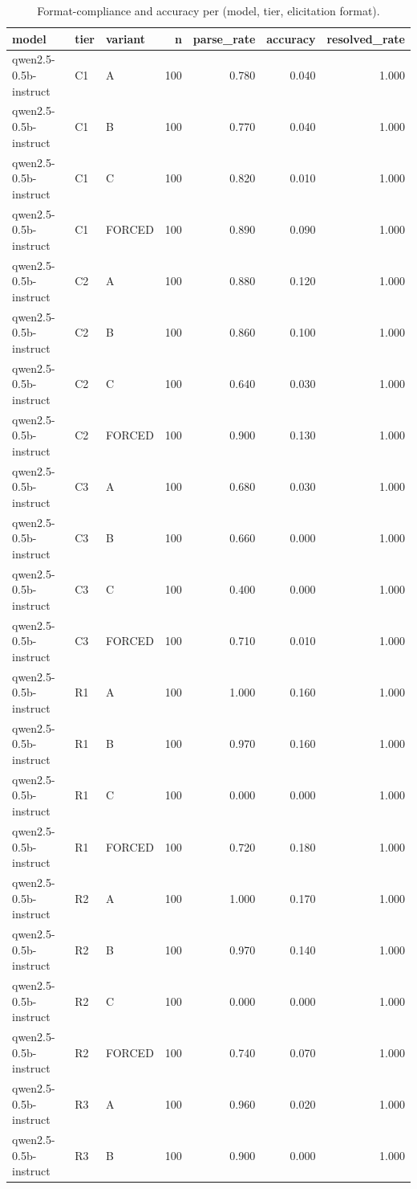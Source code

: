 \begin{table}
\caption{Format-compliance and accuracy per (model, tier, elicitation format).}
\label{tab:t3_parse_and_accuracy}
\begin{tabular}{lllrrrr}
\toprule
model & tier & variant & n & parse\_rate & accuracy & resolved\_rate \\
\midrule
qwen2.5-0.5b-instruct & C1 & A & 100 & 0.780 & 0.040 & 1.000 \\
qwen2.5-0.5b-instruct & C1 & B & 100 & 0.770 & 0.040 & 1.000 \\
qwen2.5-0.5b-instruct & C1 & C & 100 & 0.820 & 0.010 & 1.000 \\
qwen2.5-0.5b-instruct & C1 & FORCED & 100 & 0.890 & 0.090 & 1.000 \\
qwen2.5-0.5b-instruct & C2 & A & 100 & 0.880 & 0.120 & 1.000 \\
qwen2.5-0.5b-instruct & C2 & B & 100 & 0.860 & 0.100 & 1.000 \\
qwen2.5-0.5b-instruct & C2 & C & 100 & 0.640 & 0.030 & 1.000 \\
qwen2.5-0.5b-instruct & C2 & FORCED & 100 & 0.900 & 0.130 & 1.000 \\
qwen2.5-0.5b-instruct & C3 & A & 100 & 0.680 & 0.030 & 1.000 \\
qwen2.5-0.5b-instruct & C3 & B & 100 & 0.660 & 0.000 & 1.000 \\
qwen2.5-0.5b-instruct & C3 & C & 100 & 0.400 & 0.000 & 1.000 \\
qwen2.5-0.5b-instruct & C3 & FORCED & 100 & 0.710 & 0.010 & 1.000 \\
qwen2.5-0.5b-instruct & R1 & A & 100 & 1.000 & 0.160 & 1.000 \\
qwen2.5-0.5b-instruct & R1 & B & 100 & 0.970 & 0.160 & 1.000 \\
qwen2.5-0.5b-instruct & R1 & C & 100 & 0.000 & 0.000 & 1.000 \\
qwen2.5-0.5b-instruct & R1 & FORCED & 100 & 0.720 & 0.180 & 1.000 \\
qwen2.5-0.5b-instruct & R2 & A & 100 & 1.000 & 0.170 & 1.000 \\
qwen2.5-0.5b-instruct & R2 & B & 100 & 0.970 & 0.140 & 1.000 \\
qwen2.5-0.5b-instruct & R2 & C & 100 & 0.000 & 0.000 & 1.000 \\
qwen2.5-0.5b-instruct & R2 & FORCED & 100 & 0.740 & 0.070 & 1.000 \\
qwen2.5-0.5b-instruct & R3 & A & 100 & 0.960 & 0.020 & 1.000 \\
qwen2.5-0.5b-instruct & R3 & B & 100 & 0.900 & 0.000 & 1.000 \\

\end{tabular}
\end{table}
